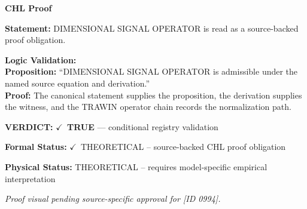 \vspace{0.45em}
\noindent\textbf{CHL Proof}\par
\textbf{Statement:} DIMENSIONAL SIGNAL OPERATOR is read as a source-backed proof obligation.

\textbf{Logic Validation:}\\
\textbf{Proposition:} ``DIMENSIONAL SIGNAL OPERATOR is admissible under the named source equation and derivation.''\\
\textbf{Proof:} The canonical statement supplies the proposition, the derivation supplies the witness, and the TRAWIN operator chain records the normalization path.

\textbf{VERDICT:} \ensuremath{\checkmark}\ \textbf{TRUE} --- conditional registry validation

\textbf{Formal Status:} \ensuremath{\checkmark}\ THEORETICAL -- source-backed CHL proof obligation

\textbf{Physical Status:} THEORETICAL -- requires model-specific empirical interpretation
\par\vspace{0.45em}
\par
\vfill
\begingroup\footnotesize\itshape
Proof visual pending source-specific approval for [ID 0994].
\par\endgroup
\vfill
\endgroup
\endgroup

